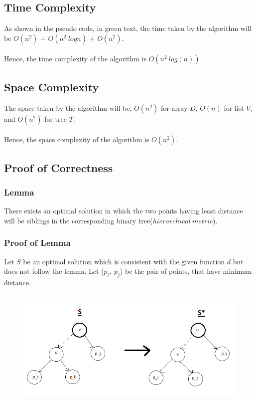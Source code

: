 \documentclass[pdftex,a4paper,12pt]{report}
\begin{document}
	
	\subsection{Time Complexity}
	As shown in the pseudo code, in green text, the time taken by the algorithm will be $O(n^2)$ + $O(n^2\ log n)$ + $O(n^2)$.\\\\
	Hence, the time complexity of the algorithm is \textbf{$O(n^2\ log(n))$}.

	\subsection{Space Complexity}
	The space taken by the algorithm will be, $O(n^2)$ for array $D$, $O(n)$ for list $V$, and $O(n^2)$ for tree $T$.\\\\
	Hence, the space complexity of the algorithm is \textbf{$O(n^2)$}.
	\newpage
	
	\subsection{Proof of Correctness}
	\subsubsection{Lemma}
	
	There exists an optimal solution in which the two points having least distance will be
	siblings in the corresponding binary tree($hierarchical\ metric$).
	
	\subsubsection{Proof of Lemma}
	Let $S$ be an optimal solution which is consistent with the given function $d$ but does not
	follow the lemma. Let ($p_i,\ p_j$) be the pair of points, that have minimum distance.\\\\
	
	\begin{figure}[ht!]
		\centering
		\includegraphics[width=150mm]{q2.png}
	\end{figure}
	
\end{document}
